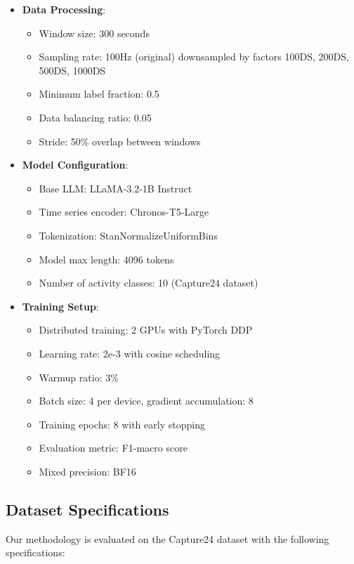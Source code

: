 \begin{itemize}
    \item \textbf{Data Processing}:
    \begin{itemize}
        \item Window size: 300 seconds
        \item Sampling rate: 100Hz (original) downsampled by factors 100DS, 200DS, 500DS, 1000DS
        \item Minimum label fraction: 0.5
        \item Data balancing ratio: 0.05
        \item Stride: 50\% overlap between windows
    \end{itemize}
    \item \textbf{Model Configuration}:
    \begin{itemize}
        \item Base LLM: LLaMA-3.2-1B Instruct
        \item Time series encoder: Chronos-T5-Large
        \item Tokenization: StanNormalizeUniformBins
        \item Model max length: 4096 tokens
        \item Number of activity classes: 10 (Capture24 dataset)
    \end{itemize}
    \item \textbf{Training Setup}:
    \begin{itemize}
        \item Distributed training: 2 GPUs with PyTorch DDP
        \item Learning rate: 2e-3 with cosine scheduling
        \item Warmup ratio: 3\%
        \item Batch size: 4 per device, gradient accumulation: 8
        \item Training epochs: 8 with early stopping
        \item Evaluation metric: F1-macro score
        \item Mixed precision: BF16
    \end{itemize}
\end{itemize}

\subsection{Dataset Specifications}

\hspace{2em}Our methodology is evaluated on the Capture24 dataset with the following specifications:

